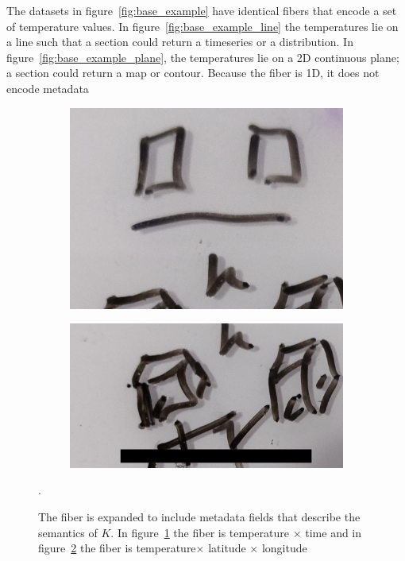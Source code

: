 The datasets in figure~\ref{fig:base_example} have identical fibers that encode a set of temperature values. In figure~\ref{fig:base_example_line} the temperatures lie on a line such that a section could return a timeseries or a distribution. In figure~\ref{fig:base_example_plane}, the temperatures lie on a 2D continuous plane; a section could return a map or contour. Because the fiber is 1D, it does not encode metadata 

\begin{figure}[ht!]
    \begin{subfigure}{.5\textwidth}
        \includegraphics[width=\textwidth]{figures/math/temp_2f.png}
        \label{fig:fiber_example_plane}
    \end{subfigure}
    \begin{subfigure}{.5\textwidth}
        \includegraphics[width=\textwidth]{figures/math/temp_3f.png}
        \label{fig:fiber_example_cube}
    \end{subfigure}
    \label{fig:fiber_example}
    \caption{The fiber is expanded to include metadata fields that describe the semantics of $K$. In figure~\ref{fig:fiber_example_plane} the fiber is \textrm{temperature} $\times$ \textrm{time} and in figure~\ref{fig:fiber_example_cube} the fiber is \textrm{temperature}$\times$ \textrm{latitude} $\times$ {longitude}}.
\end{figure}

